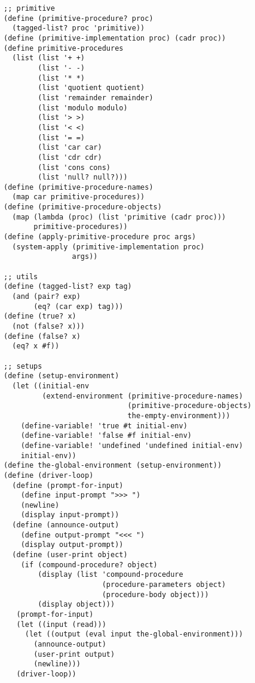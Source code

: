 \documentclass[../main.tex]{subfiles}
\begin{document}
\begin{lstlisting}
;; primitive
(define (primitive-procedure? proc)
  (tagged-list? proc 'primitive))
(define (primitive-implementation proc) (cadr proc))
(define primitive-procedures
  (list (list '+ +)
        (list '- -)
        (list '* *)
        (list 'quotient quotient)
        (list 'remainder remainder)
        (list 'modulo modulo)
        (list '> >)
        (list '< <)
        (list '= =)
        (list 'car car)
        (list 'cdr cdr)
        (list 'cons cons)
        (list 'null? null?)))
(define (primitive-procedure-names)
  (map car primitive-procedures))
(define (primitive-procedure-objects)
  (map (lambda (proc) (list 'primitive (cadr proc)))
       primitive-procedures))
(define (apply-primitive-procedure proc args)
  (system-apply (primitive-implementation proc)
                args))

;; utils
(define (tagged-list? exp tag)
  (and (pair? exp)
       (eq? (car exp) tag)))
(define (true? x)
  (not (false? x)))
(define (false? x)
  (eq? x #f))

;; setups
(define (setup-environment)
  (let ((initial-env
         (extend-environment (primitive-procedure-names)
                             (primitive-procedure-objects)
                             the-empty-environment)))
    (define-variable! 'true #t initial-env)
    (define-variable! 'false #f initial-env)
    (define-variable! 'undefined 'undefined initial-env)
    initial-env))
(define the-global-environment (setup-environment))
(define (driver-loop)
  (define (prompt-for-input)
    (define input-prompt ">>> ")
    (newline)
    (display input-prompt))
  (define (announce-output)
    (define output-prompt "<<< ")
    (display output-prompt))
  (define (user-print object)
    (if (compound-procedure? object)
        (display (list 'compound-procedure
                       (procedure-parameters object)
                       (procedure-body object)))
        (display object)))
   (prompt-for-input)
   (let ((input (read)))
     (let ((output (eval input the-global-environment)))
       (announce-output)
       (user-print output)
       (newline)))
   (driver-loop))
\end{lstlisting}
\end{document}
